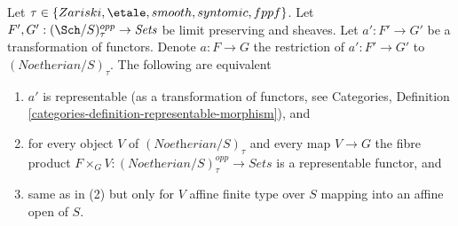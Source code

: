 %
\begin{lemma}
\label{lemma-representable}
Let $\tau \in \{Zariski, \etale, smooth, syntomic, fppf\}$.
Let $F', G' : (\Sch/S)_\tau^{opp} \to \textit{Sets}$ be limit preserving
and sheaves. Let $a' : F' \to G'$ be a transformation of functors.
Denote $a : F \to G$ the restriction of $a' : F' \to G'$ to
$(\textit{Noetherian}/S)_\tau$. The following are equivalent
\begin{enumerate}
\item $a'$ is representable (as a transformation of functors, see
Categories, Definition \ref{categories-definition-representable-morphism}), and
\item for every object $V$ of $(\textit{Noetherian}/S)_\tau$
and every map $V \to G$ the fibre product
$F \times_G V : (\textit{Noetherian}/S)_\tau^{opp} \to \textit{Sets}$
is a representable functor, and
\item same as in (2) but only for $V$ affine finite type over $S$
mapping into an affine open of $S$.
\end{enumerate}
\end{lemma}

